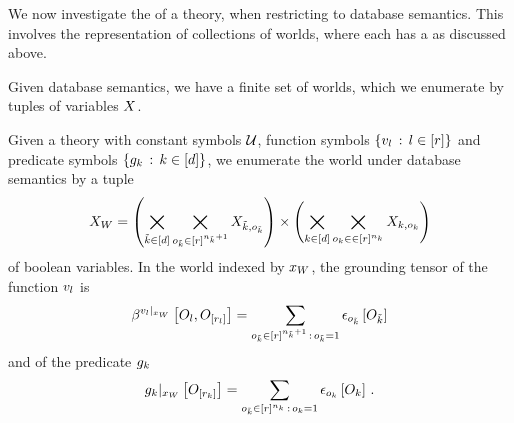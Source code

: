 
We now investigate the \semanticStructure{} of a \firstOrderLogic{} theory, when restricting to database semantics.
This involves the representation of collections of worlds, where each has a \substitutionStructure{} as discussed above.


Given database semantics, we have a finite set of worlds, which we enumerate by tuples of variables $X$.

\begin{definition}
    \label{def:worldEnumeratingVariables}
    Given a \firstOrderLogic{} theory with constant symbols $\mathcal{U}$, function symbols $\{v_{l}\,:\,l\in[r]\}$ and predicate symbols $\{g_{k}\,:\,k\in[d]\}$, we enumerate the world under database semantics by a tuple
    \begin{align*}
        X_{W}
        = \left(\bigtimes_{\tilde{k}\in[d]}\bigtimes_{o_{\tilde{k}}\in[r]^{n_{\tilde{k}}+1}} X_{\tilde{k},o_{\tilde{k}}} \right)
        \times \left(\bigtimes_{k\in[d]}\bigtimes_{o_{k}\in\in[r]^{n_{k}}} X_{k,o_{k}} \right)
    \end{align*}
    of boolean variables.
    In the world indexed by $x_{W}$, the grounding tensor of the function $v_{l}$ is
    \begin{align*}
        \beta^{{v_{l}}|_{x_{W}}}\left[O_{l},O_{[r_{l}]}\right]
        = \sum_{o_{\tilde{k}}\in[r]^{n_{\tilde{k}}+1}\,:\,o_{\tilde{k}}=1} \epsilon_{o_{\tilde{k}}}\left[O_{\tilde{k}}\right]
    \end{align*}
    and of the predicate $g_{k}$
    \begin{align*}
        {g_{k}}|_{x_{W}} \left[O_{[r_{k}]}\right]
        = \sum_{o_{\tilde{k}}\in[r]^{n_{k}}\,:\,o_{k}=1}
        \epsilon_{o_{k}}\left[O_{k}\right] \, .
    \end{align*}
\end{definition}

